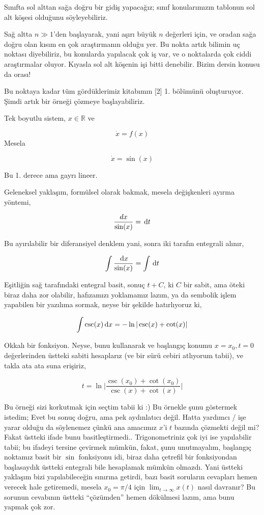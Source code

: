 \documentclass[12pt,fleqn]{article}\usepackage{../../common}
\begin{document}
Sınıfta sol alttan sağa doğru bir gidiş yapacağız; sınıf konularımızın
tablonun sol alt köşesi olduğunu söyleyebiliriz.

Sağ altta $n \gg 1$'den başlayarak, yani aşırı büyük $n$ değerleri için, ve
oradan sağa doğru olan kısım en çok araştırmanın olduğu yer. Bu nokta artık
bilimin uç noktası diyebiliriz, bu konularda yapılacak çok iş var, ve o
noktalarda çok ciddi araştırmalar oluyor. Kıyasla sol alt köşenin işi bitti
denebilir. Bizim dersin konusu da orası!

Bu noktaya kadar tüm gördüklerimiz kitabımın [2] 1. bölümünü
oluşturuyor. Şimdi artık bir örneği çözmeye başlayabiliriz.

Tek boyutlu sistem, $x \in \mathbb{R}$ ve

$$
\dot{x} = f(x)
$$
Mesela 

$$
\dot{x} = \sin(x)
$$

Bu 1. derece ama gayrı lineer. 

Geleneksel yaklaşım, formülsel olarak bakmak, mesela değişkenleri ayırma
yöntemi, 

$$ \frac{dx}{\sin(x)} = \,\mathrm{d} t $$

Bu ayırılabilir bir diferansiyel denklem yani, sonra iki tarafın entegrali
alınır, 

$$ \int \frac{\,\mathrm{d} x}{\sin(x)} = \int \,\mathrm{d} t $$

Eşitliğin sağ tarafındaki entegral basit, sonuç $t + C$, ki $C$ bir sabit,
ama öteki biraz daha zor olabilir, hafızamızı yoklamamız lazım, ya da
sembolik işlem yapabilen bir yazılıma sormak, neyse bir şekilde
hatırlıyoruz ki,

$$ \int \csc(x) \,\mathrm{d} x = - \ln |\csc (x) + \cot (x)| $$

Okkalı bir fonksiyon. Neyse, bunu kullanarak ve başlangıç konumu
$x=x_0,t=0$ değerlerinden üstteki sabiti hesaplarız (ve bir sürü cebiri
atlıyorum tabii), ve takla ata ata suna erişiriz,

$$ t = \ln \bigg| \frac{\csc(x_0) + \cot(x_0)}{\csc(x) + \cot(x)} \bigg|   $$

Bu örneği sizi korkutmak için seçtim tabii ki :) Bu örnekle şunu göstermek
istedim; Evet bu sonuç doğru, ama pek aydınlatıcı değil. Hatta yardımcı / işe
yarar olduğu da söylenemez çünkü ana amacımız $x$'i $t$ bazında çözmekti değil
mi? Fakat üstteki ifade bunu basitleştirmedi.. Trigonometriniz çok iyi ise
yapılabilir tabii; bu ifadeyi tersine çevirmek mümkün, fakat, şunu unutmayalım,
başlangıç noktamız basit bir $\sin$ fonksiyonu idi, biraz daha çetrefil bir
fonksiyondan başlasaydık üstteki entegrali bile hesaplamak mümkün olmazdı. Yani
üstteki yaklaşım bizi yapılabileceğin sınırına getirdi, bazı basit soruların
cevapları hemen verecek hale getiremedi, mesela $x_0 = \pi / 4$ için $\lim_{t
  \to \infty} x(t)$ nasıl davranır? Bu sorunun cevabının üstteki ``çözümden''
hemen dökülmesi lazım, ama bunu yapmak çok zor.
\end{document}
